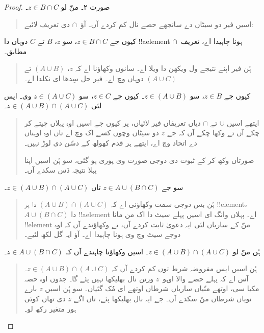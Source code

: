 \documentclass[../../../include/open-logic-section]{subfiles}
\begin{document}
\begin{proof}
صورت ۲۔ منّ لو $z \in B \cap C$۔
\begin{quote}
اسیں فیر دو سیٹاں دے سانجھے حصے نال کم کردے آں۔ آؤ~$\cap$ دی تعریف لائیے:
\end{quote}
کیوں جے $z \in B \cap C$، سو $z$، $B$ تے $C$ دوہاں دا !!a{element} ہونا چاہیدا اے، تعریف~$\cap$ مطابق۔
\begin{quote}
ہُن فیر اپنے نتیجے ول ویکھن دا ویلا اے۔ سانوں وکھاؤنا اے کہ $z$، $(A \cup B)$ تے $(A \cup C)$ دوہاں وچ اے۔ فیر حل سِدھا ای نکلدا اے۔
\end{quote}
کیوں جے $z \in B$، سو $z \in (A \cup B)$۔ کیوں جے $z \in C$، سو $z \in (A
\cup C)$ وی۔ ایس لئی $z \in (A \cup B) \cap (A \cup C)$۔
\begin{quote}
ایتھے اسیں $\cup$ تے $\cap$ دیاں تعریفاں فیر لائیاں، پر کیوں جے اسیں اوہ پہلاں چیتے کر چکے آں تے وکھا چکے آں کہ جے $z$ دو سیٹاں وچوں کسے اک وچ اے تاں اوہ اوہناں دے اتحاد وچ اے، ایتھے ہر قدم کھولھ کے دسّن دی لوڑ نہیں۔

صورتاں وکھ کر کے ثبوت دی دوجی صورت وی پوری ہو گئی، سو ہُن اسیں اپنا پہلا نتیجہ دَس سکدے آں۔
\end{quote}
سو جے $z \in A \cup (B \cap C)$ تاں $z \in (A \cup B) \cap (A \cup C)$۔
\begin{quote}
ہُن بس دوجی سمت وکھاؤنی اے کہ $(A \cup B) \cap (A \cup C)$ دا ہر !!{element}، $A \cup (B \cap
C)$ دا !!a{element} اے۔ پہلاں وانگ ای اسیں پہلے سیٹ دا اک من مانا !!{element} منّ کے ساریاں لئی ایہ دعویٰ ثابت کردے آں، تے وکھاؤندے آں کہ اوہ دوجے سیٹ وچ وی ہونا چاہیدا اے۔ آؤ ایہ گل لکھ لئیے۔
\end{quote}
ہُن منّ لو $z \in (A \cup B) \cap (A \cup C)$۔ اسیں وکھاؤنا چاہندے آں کہ $z \in A \cup (B \cap C)$۔
\begin{quote}
ہُن اسیں ایس مفروضہ شرط توں کم کردے آں کہ $z \in (A \cup B) \cap (A
\cup C)$۔ آس اے کہ پہلے حصے والا اوہو~$z$ ورتن نال بھلیکھا نہیں پئے گا۔ جدوں اوہ حصہ مکیا سی، اوتھے منّیاں ساریاں شرطاں اوتھے ای مُک گئیاں۔ سو ہُن اسیں $z$ بارے نویاں شرطاں منّ سکدے آں۔ جے ایہ نال بھلیکھا پئے، تاں اگے $z$ دی تھاں کوئی ہور متغیر رکھ لو۔


\end{quote}
\end{proof}
\end{document}
